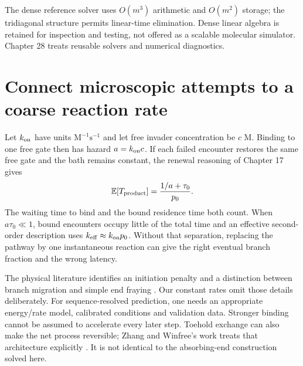 The dense reference solver uses $O(m^3)$ arithmetic and $O(m^2)$ storage;
the tridiagonal structure permits linear-time elimination. Dense linear algebra
is retained for inspection and testing, not offered as a scalable molecular
simulator. Chapter 28 treats reusable solvers and numerical diagnostics.

\section{Connect microscopic attempts to a coarse reaction rate}
Let $k_{\rm on}$ have units $\mathrm{M}^{-1}\mathrm{s}^{-1}$ and let free
invader concentration be $c$ M. Binding to one free gate then has hazard
$a=k_{\rm on}c$. If each failed encounter restores the same free gate and
the bath remains constant, the renewal reasoning of Chapter 17 gives
\begin{equation}
 \mathbb E[T_{\rm product}]=\frac{1/a+\tau_0}{p_0}.
 \label{eq:renewal}
\end{equation}
The waiting time to bind and the bound residence time both count. When
$a\tau_0\ll1$, bound encounters occupy little of the total time and an
effective second-order description uses $k_{\rm eff}\approx k_{\rm on}p_0$.
Without that separation, replacing the pathway by one instantaneous reaction
can give the right eventual branch fraction and the wrong latency.

The physical literature identifies an initiation penalty and a distinction
between branch migration and simple end fraying \cite{srinivas}. Our constant
rates omit those details deliberately. For sequence-resolved prediction, one
needs an appropriate energy/rate model, calibrated conditions and validation
data. Stronger binding cannot be assumed to accelerate every later step.
Toehold exchange can also make the net process reversible; Zhang and Winfree's
work treats that architecture explicitly \cite{zhang}. It is not identical to
the absorbing-end construction solved here.


